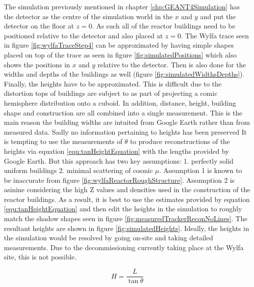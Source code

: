 The simulation previously mentioned in chapter \ref{chp:GEANT4Simulation} has the detector as the centre of the simulation world in the $x$ and $y$ and put the detector on the floor at  $z = 0 $. As such all of the reactor buildings need to be positioned relative to the detector and also placed at $z = 0$. The Wylfa trace seen in figure \ref{fig:wylfaTraceStep4} can be approximated by having simple shapes placed on top of the trace as seen in figure \ref{fig:simulatedPositions} which also shows the positions in $x$ and $y$ relative to the detector. Then is also done for the widths and depths of the buildings as well (figure \ref{fig:simulatedWidthsDepths}). Finally, the heights have to be approximated. This is difficult due to the distortion tops of buildings are subject to as part of projecting a comic hemisphere distribution onto a cuboid. In addition, distance, height, building shape and construction are all combined into a single measurement. This is the main reason the building widths are intuited from Google Earth rather than from measured data. Sadly no information pertaining to heights has been preserved It is tempting to use the measurements of $\theta$ to produce reconstructions of the heights via equation \ref{equ:tanHeightEquation} with the lengths provided by Google Earth. But this approach has two key assumptions: 1. perfectly solid uniform buildings 2. minimal scattering of cosmic $\mu$. Assumption 1 is known to be inaccurate from figure \ref{fig:wylfaReactorRoughStructure}. Assumption 2 is asinine considering the high Z values and densities used in the construction of the reactor buildings. As a result, it is best to use the estimates provided by equation \ref{equ:tanHeightEquation} and then edit the heights in the simulation to roughly match the shadow shapes seen in figure \ref{fig:measuredTrackerReconNoLines}. The resultant heights are shown in figure \ref{fig:simulatedHeights}. Ideally, the heights in the simulation would be resolved by going on-site and taking detailed measurements. Due to the decommissioning currently taking place at the Wylfa site, this is not possible. %

\begin{equation}
H = \frac{L}{\tan{\theta}}
\label{equ:tanHeightEquation}
\end{equation}

